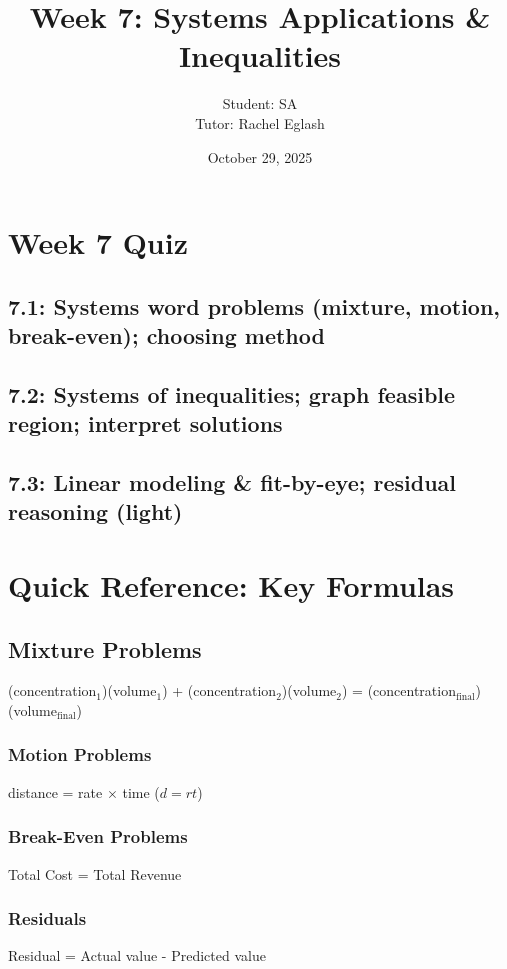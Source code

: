 \documentclass[12pt]{article}
\title{Week 7: Systems Applications \& Inequalities}
\author{
	Student: SA\\
	Tutor: Rachel Eglash}
\date{October 29, 2025}
\begin{document}
	
	\maketitle

	\section*{Week 7 Quiz}
        
        \subsection*{7.1: Systems word problems (mixture, motion, break-even); choosing method}

	    \subsection*{7.2: Systems of inequalities; graph feasible region; interpret solutions}
        
        \subsection*{7.3: Linear modeling \& fit-by-eye; residual reasoning (light)}
	    
            \newpage
	
	\section*{Quick Reference: Key Formulas}
	
	    \subsection*{Mixture Problems}
		    (concentration$_1$)(volume$_1$) + (concentration$_2$)(volume$_2$) = (concentration$_{\text{final}}$)(volume$_{\text{final}}$)
	
	    \subsubsection*{Motion Problems}
		    distance = rate $\times$ time \quad ($d = rt$)
	
	    \subsubsection*{Break-Even Problems}
    		Total Cost = Total Revenue
	
        \subsubsection*{Residuals}
	    	Residual = Actual value - Predicted value
\end{document}
